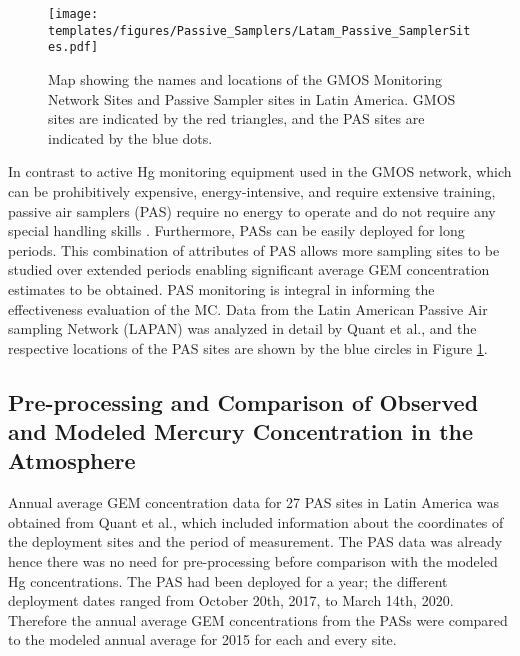 \begin{figure}[H]
 \centering
  \texttt{[image: templates/figures/Passive\_Samplers/Latam\_Passive\_SamplerSites.pdf]}
  \caption{Map showing the names and locations of the GMOS Monitoring Network Sites and Passive Sampler sites in Latin America. GMOS sites are indicated by the red triangles, and the PAS sites are indicated by the blue dots\cite{quant_measuring_2021,koenig_seasonal_2021}.}
  \label{fig:Latam_Passive_SamplerSites}
\end{figure}
\FloatBarrier

\begin{flushleft}
    In contrast to active Hg monitoring equipment used in the GMOS network, which can be prohibitively expensive, energy-intensive, and require extensive training, passive air samplers (PAS) require no energy to operate and do not require any special handling skills \cite{quant_measuring_2021}. Furthermore, PASs can be easily deployed for long periods. This combination of attributes of PAS allows more sampling sites to be studied over extended periods enabling significant average GEM concentration estimates to be obtained. PAS monitoring is integral in informing the effectiveness evaluation of the MC\cite{gustin_measuring_2015,unep_guidance_2021}. Data from the Latin American Passive Air sampling Network (LAPAN) was analyzed in detail by Quant et al.\cite{quant_measuring_2021}, and the respective locations of the PAS sites are shown by the blue circles in Figure \ref{fig:Latam_Passive_SamplerSites}.  
\end{flushleft}

\subsection{Pre-processing and Comparison of Observed and Modeled Mercury Concentration in the Atmosphere}\label{c2_observation_data_manipulation}
\begin{flushleft}
  Annual average GEM concentration data for 27 PAS sites in Latin America was obtained from Quant et al.\cite{quant_measuring_2021}, which included information about the coordinates of the deployment sites and the period of measurement. The PAS data was already \nang hence there was no need for pre-processing before comparison with the modeled Hg concentrations. The PAS had been deployed for a year; the different deployment dates ranged from October 20th, 2017, to March 14th, 2020. Therefore the annual average GEM concentrations from the PASs were compared to the modeled annual average \hg for 2015 for each and every site. 
  \end{flushleft}

